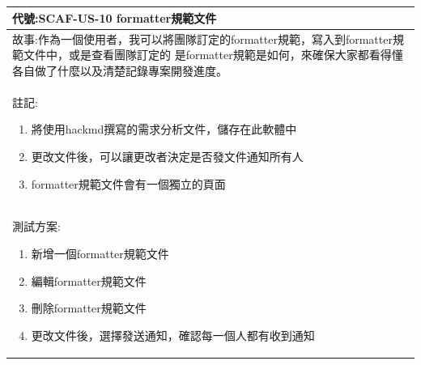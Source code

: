 \documentclass{report}
\begin{document}
\subsection*{}
\fontsize{12}{20}\selectfont
\begin{tabularx}{\textwidth}{|X|}
  \hline
  代號:SCAF-US-10 formatter規範文件 \\
  \hline
  故事:作為一個使用者，我可以將團隊訂定的formatter規範，寫入到formatter規範文件中，或是查看團隊訂定的
  是formatter規範是如何，來確保大家都看得懂各自做了什麼以及清楚記錄專案開發進度。 \\
  \hline
  註記:
  \begin{enumerate}
    \item 將使用hackmd撰寫的需求分析文件，儲存在此軟體中
    \item 更改文件後，可以讓更改者決定是否發文件通知所有人
    \item formatter規範文件會有一個獨立的頁面
  \end{enumerate} \\
  \hline
  測試方案:
  \begin{enumerate}
    \item 新增一個formatter規範文件
    \item 編輯formatter規範文件
    \item 刪除formatter規範文件
    \item 更改文件後，選擇發送通知，確認每一個人都有收到通知
  \end{enumerate} \\
  \hline
\end{tabularx}
\end{document}
